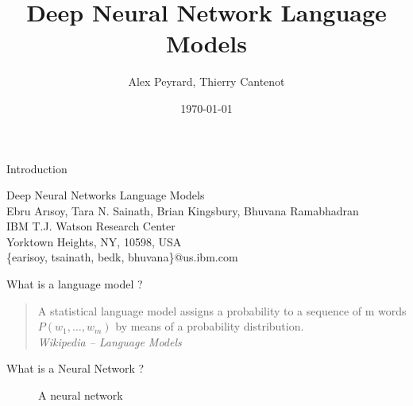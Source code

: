 \documentclass{beamer}
\title[DNNLM]{Deep Neural Network Language Models}
\author[A. Peyrard, T. Cantenot]{Alex Peyrard, Thierry Cantenot}
\institute{Shanghai JiaoTong University}
\date{\today}
\begin{document}
\begin{frame}[plain]
	  \titlepage
\end{frame}
\begin{frame}{Introduction}
\begin{center}
Deep Neural Networks Language Models\\
Ebru Arısoy, Tara N. Sainath, Brian Kingsbury, Bhuvana Ramabhadran\\
IBM T.J. Watson Research Center\\
Yorktown Heights, NY, 10598, USA\\
\{earisoy, tsainath, bedk, bhuvana\}@us.ibm.com
\end{center}

\end{frame}
\begin{frame}{What is a language model ?}
\begin{quote}
A statistical language model assigns a probability to a sequence of m words $P(w_1,\ldots,w_m)$ by means of a probability distribution. \\ \flushright\emph{Wikipedia -- Language Models}
\end{quote}
\end{frame}
\begin{frame}{What is a Neural Network ?}
\begin{figure}[!ht]
	\centering
	\rule{0cm}{0cm}
	
	\caption{A neural network}
\end{figure}
\end{frame}
\end{document}
